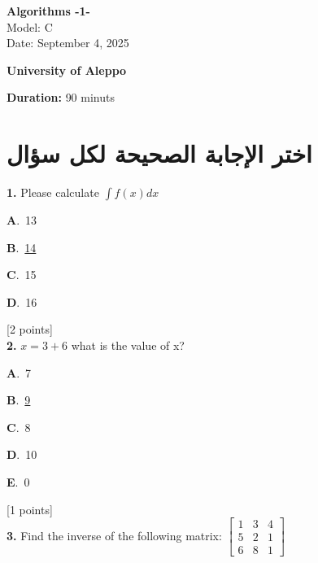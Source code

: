 \documentclass[12pt]{article}
\newcommand{\choice}[3]{%
  \noindent\textbf{#1}.~#2\hfill#3\par\vspace{0.25em}
}
\begin{document}
\begin{flushright}
{\Large \textbf{{\textenglish{Algorithms -1-}}}}\\[0.25em]
{\normalsize \textenglish{Model: }{\textenglish{C}}}\\[0.1em]
{\normalsize \textenglish{Date: }{\textenglish{September 4, 2025}}}
\end{flushright}

\vspace{0.6cm}

\noindent
\begin{minipage}[t]{0.65\textwidth}
  \raggedright
  \textbf{{\textenglish{University of Aleppo}}}\\[0.3em]
\end{minipage}\hfill
\begin{minipage}[t]{0.3\textwidth}
  \raggedleft
  \textenglish{\textbf{Duration: }}{\textenglish{90 minuts}}
\end{minipage}

\vspace{0.9cm}

\section*{اختر الإجابة الصحيحة لكل سؤال}

\noindent \textbf{\textenglish{1.}} {\textenglish{Please calculate }}\(\int f(x)dx\)

\noindent\choice{A}{{\textenglish{13}}}{}
\noindent\choice{B}{\underline{{\textenglish{14}}}}{}
\noindent\choice{C}{{\textenglish{15}}}{}
\noindent\choice{D}{{\textenglish{16}}}{}
\hfill {\textenglish{[2 points]}}\\[0.5em]

\noindent \textbf{\textenglish{2.}} \(x=3+6 \){\textenglish{ what is the value of x?}}

\noindent\choice{A}{{\textenglish{7}}}{}
\noindent\choice{B}{\underline{{\textenglish{9}}}}{}
\noindent\choice{C}{{\textenglish{8}}}{}
\noindent\choice{D}{{\textenglish{10}}}{}
\noindent\choice{E}{{\textenglish{0}}}{}
\hfill {\textenglish{[1 points]}}\\[0.5em]

\noindent \textbf{\textenglish{3.}} {\textenglish{Find the inverse of the following matrix: }}\(\begin{bmatrix} 1 & 3 & 4 \\ 5 & 2 & 1 \\ 6 & 8 & 1 \end{bmatrix}\)
\end{document}
